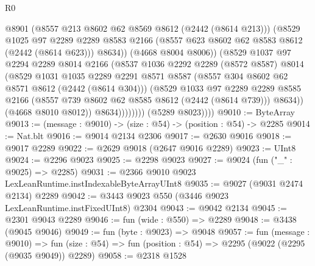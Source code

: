 \begin{lexlean}{R0}
\begin{coremodule}
                            @8901
                            (@8557 @213 @8602 @62 @8569 @8612 (@2442 (@8614 @213)))
                            (@8529
                              @1025
                              @97
                              @2289
                              @2289
                              @8583
                              @2166
                              (@8557 @623 @8602 @62 @8583 @8612 (@2442 (@8614 @623)))
                              @8634))
                          (@4668 @8004 @8006))
                        (@8529
                          @1037
                          @97
                          @2294
                          @2289
                          @8014
                          @2166
                          (@8537
                            @1036
                            @2292
                            @2289
                            (@8572 @8587)
                            @8014
                            (@8529
                              @1031
                              @1035
                              @2289
                              @2291
                              @8571
                              @8587
                              (@8557 @304 @8602 @62 @8571 @8612 (@2442 (@8614 @304)))
                              (@8529
                                @1033
                                @97
                                @2289
                                @2289
                                @8585
                                @2166
                                (@8557 @739 @8602 @62 @8585 @8612 (@2442 (@8614 @739)))
                                @8634))
                            (@4668 @8010 @8012))
                          @8634))))))))
          (@5289 @8023))))
@9010 := ByteArray
@9013 := (message : @9010) -> (size : @54) -> (position : @54) -> @2285
@9014 := Nat.blt
@9016 := @9014 @2134 @2306
@9017 := @2630 @9016
@9018 := @9017 @2289
@9022 := @2629 @9018 (@2647 @9016 @2289)
@9023 := UInt8
@9024 := @2296 @9023
@9025 := @2298 @9023
@9027 := @9024 (fun ("_" : @9025) => @2285)
@9031 := @2366 @9010 @9023 LexLeanRuntime.instIndexableByteArrayUInt8
@9035 := @9027 (@9031 @2474 @2134) @2289
@9042 := @3443 @9023 @550 (@3446 @9023 LexLeanRuntime.instFixedUInt8) @2304
@9043 := @9042 @2134
@9045 := @2301 @9043 @2289
@9046 := fun (wide : @550) => @2289
@9048 := @3438 (@9045 @9046)
@9049 := fun (byte : @9023) => @9048
@9057 := fun (message : @9010) =>
  fun (size : @54) => fun (position : @54) => @2295 (@9022 (@2295 (@9035 @9049)) @2289)
@9058 := @2318 @1528

\end{coremodule}
\end{lexlean}
